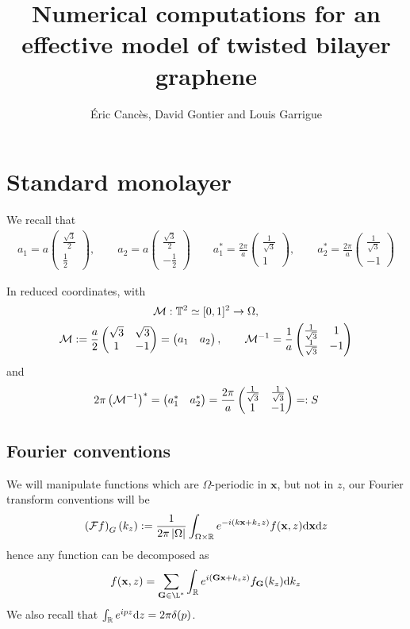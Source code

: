 \documentclass[11pt,a4paper,reqno,french,tikz]{amsart}
\title[Numerics effective TBG]{Numerical computations for an effective model of twisted bilayer graphene}
\author[É. Cancès, D. Gontier and L. Garrigue]{Éric Cancès, David Gontier and Louis Garrigue}
\def\d{{\rm d}}
\newcommand{\pa}[1]{\left( #1 \right)} %
\newcommand{\ab}[1]{\left|#1\right|} %
\newcommand{\f}[2]{\frac{#1}{#2}} %
\newcommand{\mat}[1]{\begin{pmatrix} #1 \end{pmatrix}} %
\def\bG{{\mathbf G}}
\def\bx{{\mathbf x}}
\begin{document}
\maketitle

\section{Standard monolayer}%
\label{sec:standard_monolayer}

We recall that 
\begin{multline*}
a_1 = a \mat{ \f{\sqrt 3}2 \\ \f 12}, \qquad a_2 = a \mat{ \f{\sqrt 3}2 \\ -\f 12} \qquad a^*_1 = \f{2\pi}{a} \mat{ \f{1}{\sqrt 3} \\ 1}, \qquad a^*_2 = \f{2\pi}{a} \mat{ \f{1}{\sqrt 3} \\ -1}
\end{multline*}

In reduced coordinates, with 
\begin{multline*}
	\cM : \mathbb{T}^2 \simeq [0,1]^2 \rightarrow \Omega, \\
	\cM :=  \f a2 \mat{\sqrt{3} & \sqrt{3} \\ 1 & -1} = \mat{a_1 & a_2}, \qquad  \cM^{-1} = \f 1a \mat{\f 1{\sqrt 3} & 1 \\ \f 1{\sqrt 3} & -1}
\end{multline*}
and
\begin{align*}
	2\pi \pa{\cM^{-1}}^* = \mat{a_1^* & a_2^*} = \f{2\pi}a \mat{\f{1}{\sqrt 3} & \f{1}{\sqrt 3} \\ 1 & -1} =: S
\end{align*}

\subsection{Fourier conventions}%
\label{sub:fourier_conventions}

We will manipulate functions which are $\Omega$-periodic in $\bx$, but not in $z$, our Fourier transform conventions will be
\begin{align*}
	\pa{\cF f}_G(k_z) := \f{1}{2\pi \ab{\Omega}} \int_{\Omega\times\R} e^{-i\pa{k \bx + k_z z}} f(\bx,z) \d \bx \d z
\end{align*}
hence any function can be decomposed as
\begin{align*}
f(\bx,z) = \sum_{\bG \in \L^*} \int_\R e^{i\pa{\bG\bx + k_z z}} f_\bG(k_z) \d k_z
\end{align*}
We also recall that $\int_\R e^{ipz} \d z = 2\pi \delta(p)$.
\end{document}
